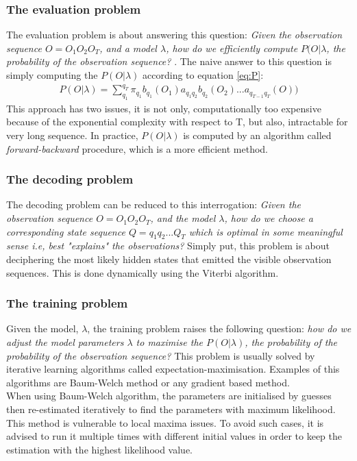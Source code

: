 \subsubsection{The evaluation problem}
The evaluation problem is about answering this question:
\textit{Given the observation sequence \(O = O_1O_2O_T\), and a model \(\lambda\), how do we efficiently compute \(P(O|\lambda\), the probability of the observation sequence?} \cite{tuto1989} \cite{ches2012} \cite{cont2013}.
The naive answer to this question is simply computing the \(P(O|\lambda)\) according to equation \ref{eq:P}:
\begin{align}
	P(O|\lambda) = \sum_{q_1}^{q_T}\pi_{q_1}b_{q_1}(O_1)a_{q_1q_2}b_{q_2}(O_2)...a_{q_{T-1}q_T}(O)) \label{eq:P}
\end{align}
This approach has two issues, it is not only, computationally too expensive because of the exponential complexity with respect to T, but also, intractable for very long sequence. In practice, \(P(O|\lambda)\) is computed by an algorithm called \textit{forward-backward} procedure, which is a more efficient method.

\subsubsection{The decoding problem}
 The decoding problem can be reduced to this interrogation: \textit{Given the observation sequence \(O = O_1O_2O_T\), and the model \(\lambda\), how do we choose a corresponding state sequence \(Q = q_1q_2...Q_T\) which is optimal in some meaningful sense i.e, best "explains" the observations?}
 Simply put, this problem is about deciphering the most likely hidden states that emitted the visible observation sequences.
 This is done dynamically using the Viterbi algorithm. %
 
\subsubsection{The training problem}
Given the model, \(\lambda\), the training problem raises the following question: \textit{how do we adjust the model parameters \(\lambda\) to maximise the \(P(O|\lambda)\), the probability of the probability of the observation sequence?}
This problem is usually solved by iterative learning algorithms called expectation-maximisation. Examples of this algorithms are Baum-Welch method or any gradient based method. \cite{tuto1989} \cite{tool2001} \cite{biol1998}
\\When using Baum-Welch algorithm, the parameters are initialised by guesses then re-estimated iteratively to find the parameters with maximum likelihood.
This method is vulnerable to local maxima issues. To avoid such cases, it is advised to run it multiple times with different initial values in order to keep the estimation with the highest likelihood value.

